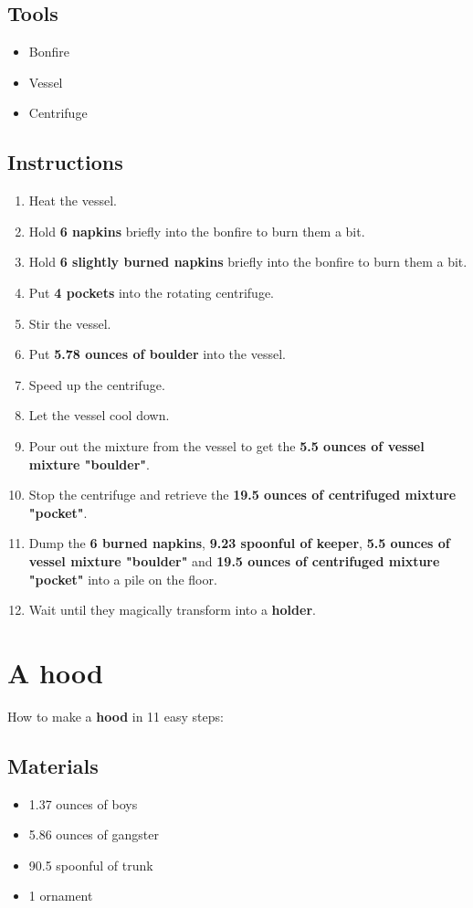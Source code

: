 \documentclass{article}
\begin{document}
\subsection{Tools}\begin{itemize}
\item 
Bonfire
\item 
Vessel
\item 
Centrifuge
\end{itemize}
\subsection{Instructions}\begin{enumerate}
\item 
Heat the vessel.
\item 
Hold \textbf{6 napkins} briefly into the bonfire to burn them a bit.
\item 
Hold \textbf{6 slightly burned napkins} briefly into the bonfire to burn them a bit.
\item 
Put \textbf{4 pockets} into the rotating centrifuge.
\item 
Stir the vessel.
\item 
Put \textbf{5.78 ounces of boulder} into the vessel.
\item 
Speed up the centrifuge.
\item 
Let the vessel cool down.
\item 
Pour out the mixture from the vessel to get the \textbf{5.5 ounces of vessel mixture "boulder"}.
\item 
Stop the centrifuge and retrieve the \textbf{19.5 ounces of centrifuged mixture "pocket"}.
\item 
Dump the \textbf{6 burned napkins}, \textbf{9.23 spoonful of keeper}, \textbf{5.5 ounces of vessel mixture "boulder"} and \textbf{19.5 ounces of centrifuged mixture "pocket"} into a pile on the floor.
\item 
Wait until they magically transform into a \textbf{holder}.
\end{enumerate}
\newpage
\section{A hood}How to make a \textbf{hood} in 11 easy steps:

\subsection{Materials}\begin{itemize}
\item 
1.37 ounces of boys
\item 
5.86 ounces of gangster
\item 
90.5 spoonful of trunk
\item 
1 ornament
\end{itemize}
\end{document}
